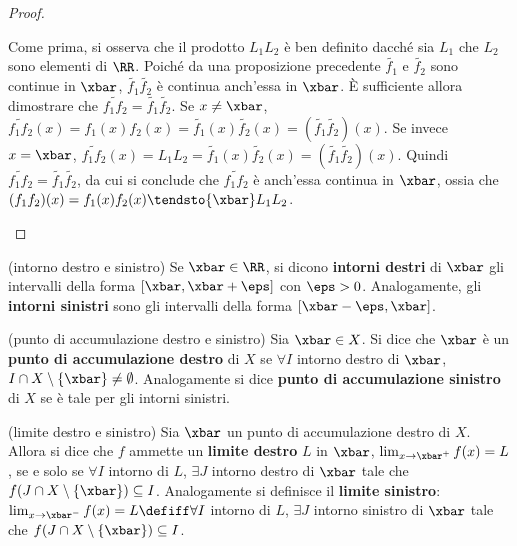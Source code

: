 \documentclass[11pt]{article}
\begin{document}
\begin{proof}
\begin{enumerate}[(i)]
			Come prima, si osserva che il prodotto $L_1 L_2$ è ben definito dacché sia $L_1$ che $L_2$ sono elementi di $\RR$.
			Poiché da una proposizione precedente $\tilde{f_1}$ e $\tilde{f_2}$ sono continue in $\xbar$, $\tilde{f_1} \tilde{f_2}$ è continua anch'essa in $\xbar$. È sufficiente allora dimostrare che $\widetilde{f_1 f_2} =
			\tilde{f_1}\tilde{f_2}$. Se $x \neq \xbar$, $\widetilde{f_1 f_2}(x) = f_1(x) f_2(x) = \tilde{f_1}(x) 	\tilde{f_2}(x) = (\tilde{f_1}\tilde{f_2})(x)$. Se invece $x = \xbar$, $\widetilde{f_1 f_2}(x) = L_1 L_2 =
			\tilde{f_1}(x) \tilde{f_2}(x) = (\tilde{f_1} \tilde{f_2})(x)$. Quindi $\widetilde{f_1 f_2} =
			\tilde{f_1} \tilde{f_2}$, da cui si conclude che $\widetilde{f_1 f_2}$ è anch'essa continua in $\xbar$, ossia
			che $(f_1 f_2)(x) = f_1(x) f_2(x) \tendsto{\xbar} L_1 L_2$.
		\end{enumerate}
	\end{proof}

	\begin{definition}
		(intorno destro e sinistro) Se $\xbar \in \RR$, si dicono
		\textbf{intorni destri} di $\xbar$ gli intervalli della forma $[\xbar, \xbar + \eps]$ con
		$\eps > 0$. Analogamente, gli \textbf{intorni sinistri} sono gli
		intervalli della forma $[\xbar - \eps, \xbar]$.
	\end{definition}

	\begin{definition}
		(punto di accumulazione destro e sinistro) Sia $\xbar \in X$.
		Si dice che $\xbar$ è un \textbf{punto di accumulazione destro}
		di $X$ se $\forall I$ intorno destro di $\xbar$, $I \cap X \setminus \{\xbar\} \neq \emptyset$. Analogamente si dice \textbf{punto di
		accumulazione sinistro} di $X$ se è tale per gli intorni sinistri.
	\end{definition}

	\begin{definition}
		(limite destro e sinistro) Sia $\xbar$ un punto di accumulazione
		destro di $X$. Allora si dice che $f$ ammette un \textbf{limite destro} $L$ in $\xbar$, $\lim_{x \to \xbar^+} f(x) = L$, se e solo se $\forall I$
		intorno di $L$, $\exists J$ intorno destro di $\xbar$ tale che
		$f(J \cap X \setminus \{\xbar\}) \subseteq I$. Analogamente si definisce
		il \textbf{limite sinistro}: $\lim_{x \to \xbar^-} f(x) = L \defiff \forall I$
		intorno di $L$, $\exists J$ intorno sinistro di $\xbar$ tale che
		$f(J \cap X \setminus \{\xbar\}) \subseteq I$.
	\end{definition}
\end{document}
